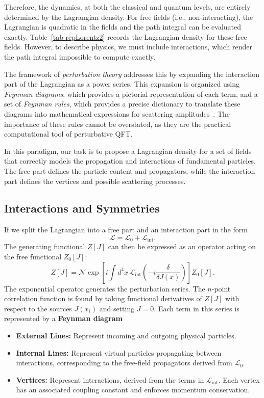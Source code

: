 Therefore, the dynamics, at both the classical and quantum levels, are entirely determined by the Lagrangian density. For free fields (i.e., non-interacting), the Lagrangian is quadratic in the fields and the path integral can be evaluated exactly. Table~\ref{tab-repLorentz2} records the Lagrangian density for these free fields. However, to describe physics, we must include interactions, which render the path integral impossible to compute exactly.

The framework of \textit{perturbation theory} addresses this by expanding the interaction part of the Lagrangian as a power series. This expansion is organized using \textit{Feynman diagrams}, which provides a pictorial representation of each term, and a set of \textit{Feynman rules}, which provides a precise dictionary to translate these diagrams into mathematical expressions for scattering amplitudes~\parencite{peskin,Weinberg}. The importance of these rules cannot be overstated, as they are the practical computational tool of perturbative QFT.


In this paradigm, our task is to propose a Lagrangian density for a set of fields that correctly models the propagation and interactions of fundamental particles. The free part defines the particle content and propagators, while the interaction part defines the vertices and possible scattering processes.

\subsection{Interactions and Symmetries}

If we split the Lagrangian into a free part and an interaction part in the form \begin{equation} \mathcal{L} = \mathcal{L}_0 + \mathcal{L}_{\text{int}}. \end{equation} The generating functional $Z[J]$ can then be expressed as an operator acting on the free functional $Z_0[J]$: 
\begin{equation} 
	Z[J] = \mathcal{N} \exp\left[i \int d^4x\, \mathcal{L}_{\text{int}}\left(-i \frac{\delta}{\delta J(x)}\right)\right] Z_0[J]. 
\end{equation} 
The exponential operator generates the perturbation series. The $n$-point correlation function is found by taking functional derivatives of $Z[J]$ with respect to the sources $J(x_i)$ and setting $J=0$. Each term in this series is represented by a \textbf{Feynman diagram} 
\begin{itemize} 
	\item \textbf{External Lines:} Represent incoming and outgoing physical particles. 
	\item \textbf{Internal Lines:} Represent virtual particles propagating between interactions, corresponding to the free-field propagators derived from $\mathcal{L}_0$. 
	\item \textbf{Vertices:} Represent interactions, derived from the terms in $\mathcal{L}_{\text{int}}$. Each vertex has an associated coupling constant and enforces momentum conservation. 
\end{itemize}

